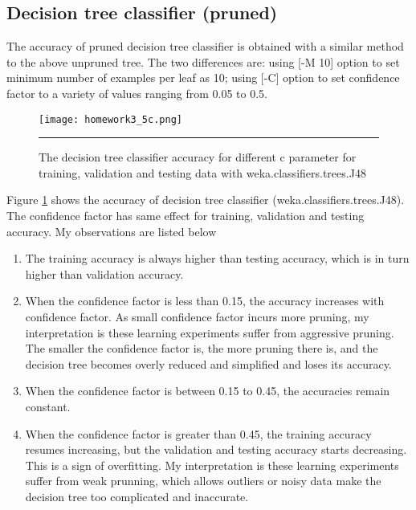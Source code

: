 \documentclass[12pt]{article}
\begin{document}
\subsection{Decision tree classifier (pruned)}
The accuracy of pruned decision tree classifier is obtained with a similar method to the above unpruned tree. The two differences are: using [-M 10] option to set minimum number of examples per leaf as 10; using [-C] option to set confidence factor to a variety of values ranging from 0.05 to 0.5.
\begin{figure}[htb]
  \centering
      {\texttt{[image: homework3\_5c.png]}} \rule{1\linewidth}{1pt}
      \caption{The decision tree classifier accuracy for different c parameter for training, validation and testing data with weka.classifiers.trees.J48}
      \label{fig:accuracy_decision_tree}
\end{figure}
Figure \ref{fig:accuracy_decision_tree} shows the accuracy of decision tree classifier (weka.classifiers.trees.J48). The confidence factor has same effect for training, validation and testing accuracy. My observations are listed below
\begin{enumerate}
\item The training accuracy is always higher than testing accuracy, which is in turn higher than validation accuracy.
\item When the confidence factor is less than 0.15, the accuracy increases with confidence factor. As small confidence factor incurs more pruning, my interpretation is these learning experiments suffer from aggressive pruning. The smaller the confidence factor is, the more pruning there is, and the decision tree becomes overly reduced and simplified and loses its accuracy.
\item When the confidence factor is between 0.15 to 0.45, the accuracies remain constant.
\item When the confidence factor is greater than 0.45, the training accuracy resumes increasing, but the validation and testing accuracy starts decreasing. This is a sign of overfitting. My interpretation is these learning experiments suffer from weak prunning, which allows outliers or noisy data make the decision tree too complicated and inaccurate.
\end{enumerate}
\end{document}
